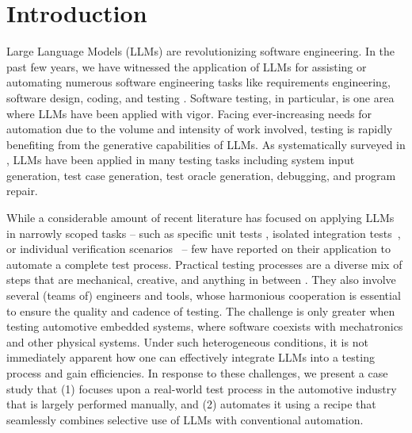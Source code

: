 \section{Introduction}
Large Language Models (LLMs) are revolutionizing software engineering. In the past few years, we have witnessed the application of LLMs for assisting or automating numerous software engineering tasks like requirements engineering, software design, coding, and testing \cite{DBLP:conf/fose-ws/FanGHLSYZ23} \cite{DBLP:journals/corr/abs-2308-10620}. Software testing, in particular, is one area where LLMs have been applied with vigor. Facing ever-increasing needs for automation due to the volume and intensity of work involved, testing is rapidly benefiting from the generative capabilities of LLMs. As systematically surveyed in \cite{DBLP:journals/tse/WangHCLWW24}, LLMs have been applied in many testing tasks including system input generation, test case generation, test oracle generation, debugging, and program repair.

While a considerable amount of recent literature has focused on applying LLMs in narrowly scoped tasks \cite{wang2024software} -- such as specific unit tests \cite{chen2023teaching}\hspace{-0.1pt}\cite{yuan2023no}, isolated integration tests~\cite{ajiga2024enhancing}, or individual verification scenarios~\cite{yoon2024intent}\hspace{-0.1pt}\cite{feldt2023towards} -- few have reported on their application to automate a complete test process. Practical testing processes are a diverse mix of steps that are mechanical, creative, and anything in between \cite{fani2023llms}\hspace{-0.1pt}\cite{boukhlif2024llms}. They also involve several (teams of) engineers and tools, whose harmonious cooperation is essential to ensure the quality and cadence of testing. The challenge is only greater when testing automotive embedded systems, where software coexists with mechatronics and other physical systems. Under such heterogeneous conditions, it is not immediately apparent how one can effectively integrate LLMs into a testing process and gain efficiencies. 
In response to these challenges, we present a case study that (1) focuses upon a real-world test process in the automotive industry that is largely performed manually, and (2) automates it using a recipe that seamlessly combines selective use of LLMs with conventional automation.




